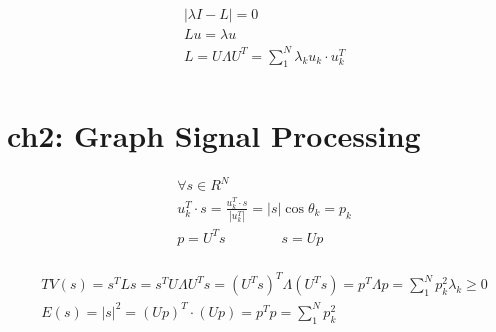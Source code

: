 \documentclass{article}
\begin{document}
%
\begin{align*}
    & | \lambda I - L | = 0  \\[3pt]
    & L u = \lambda u  \\[3pt]
    & L = U \Lambda U^{T} = \sum_{1}^{N} \lambda_{k} u_{k} \cdot u_{k}^{T}  \\[3pt]
\end{align*}


\newpage
\section*{ch2: Graph Signal Processing}


%
\begin{align*}
    & \forall s \in R^{N}  \\[3pt]
    & u_{k}^{T} \cdot s 
      = \frac{u_{k}^{T} \cdot s}{|u_{k}^{T}|} 
      = |s| \cos \theta_{k} = p_{k}  \\[3pt]
    & p = U^{T} s \qquad \qquad s = U p  \\[3pt]
\end{align*}

%
\begin{align*}
    & TV(s) = s^{T} L s = s^{T} U \Lambda U^{T} s 
      = ( U^{T} s )^{T} \Lambda ( U^{T} s ) 
      = p^{T} \Lambda p 
      = \sum_{1}^{N} p_{k}^{2} \lambda_{k} \ge 0  \\[3pt]
    & E(s) = |s|^{2} = ( U p )^{T} \cdot ( U p ) 
      = p^{T} p = \sum_{1}^{N} p_{k}^{2}  \\[3pt]
\end{align*}
\end{document}
